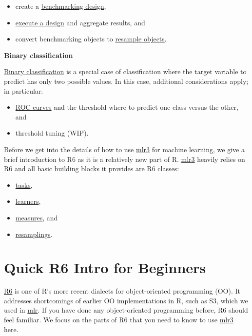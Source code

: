\documentclass[
]{scrbook}
\providecommand{\tightlist}{%
  \setlength{\itemsep}{0pt}\setlength{\parskip}{0pt}}
\begin{document}
\begin{itemize}
\tightlist
\item
  create a \protect\hyperlink{bm-design}{benchmarking design},
\item
  \protect\hyperlink{bm-exec}{execute a design} and aggregate results, and
\item
  convert benchmarking objects to \protect\hyperlink{bm-resamp}{resample objects}.
\end{itemize}

\textbf{Binary classification}

\protect\hyperlink{binary-classification}{Binary classification} is a special case of classification where the target variable to predict has only two possible values.
In this case, additional considerations apply; in particular:

\begin{itemize}
\tightlist
\item
  \protect\hyperlink{binary-roc}{ROC curves} and the threshold where to predict one class versus the other, and
\item
  threshold tuning (WIP).
\end{itemize}

Before we get into the details of how to use \href{https://mlr3.mlr-org.com}{mlr3} for machine learning, we give a brief introduction to R6 as it is a relatively new part of R.
\href{https://mlr3.mlr-org.com}{mlr3} heavily relies on R6 and all basic building blocks it provides are R6 classes:

\begin{itemize}
\tightlist
\item
  \protect\hyperlink{tasks}{tasks},
\item
  \protect\hyperlink{learners}{learners},
\item
  \protect\hyperlink{list-measures}{measures}, and
\item
  \protect\hyperlink{resampling}{resamplings}.
\end{itemize}

\hypertarget{r6}{%
\section{Quick R6 Intro for Beginners}\label{r6}}

\href{https://cran.r-project.org/package=R6}{R6} is one of R's more recent dialects for object-oriented programming (OO).
It addresses shortcomings of earlier OO implementations in R, such as S3, which we used in \href{https://mlr.mlr-org.com}{mlr}.
If you have done any object-oriented programming before, R6 should feel familiar.
We focus on the parts of R6 that you need to know to use \href{https://mlr3.mlr-org.com}{mlr3} here.
\end{document}
